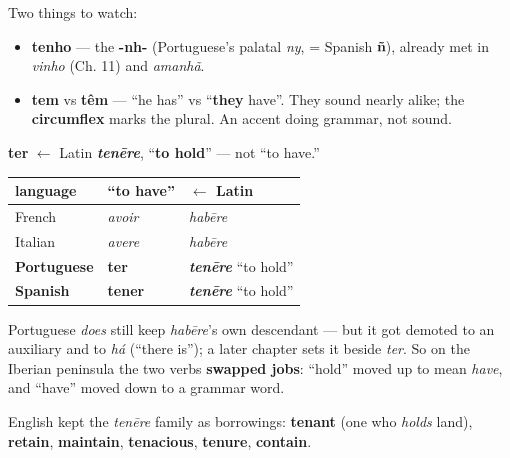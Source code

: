 Two things to watch:

\begin{itemize}
\raggedright
  \item \textbf{tenho} — the \textbf{-nh-} (Portuguese's palatal \emph{ny}, = Spanish \textbf{ñ}), already met in \emph{vinho} (Ch. 11) and \emph{amanhã}.
  \item \textbf{tem} vs \textbf{têm} — \textquotedblleft{}he has\textquotedblright{} vs \textquotedblleft{}\textbf{they} have\textquotedblright{}. They sound nearly alike; the \textbf{circumflex} marks the plural. An accent doing grammar, not sound.
\end{itemize}

\begin{cousinweb}
\textbf{ter} $\leftarrow$ Latin \emph{\textbf{tenēre}}, \textquotedblleft{}\textbf{to hold}\textquotedblright{} — not \textquotedblleft{}to have.\textquotedblright{}

\noindent
\begin{tabularx}{\linewidth}{@{}>{\raggedright\arraybackslash}X>{\raggedright\arraybackslash}X>{\raggedright\arraybackslash}X@{}}
\toprule
\textbf{language} & \textbf{\textquotedblleft{}to have\textquotedblright{}} & \textbf{$\leftarrow$ Latin} \\
\midrule
French & \emph{avoir} & \emph{habēre} \\
Italian & \emph{avere} & \emph{habēre} \\
\textbf{Portuguese} & \textbf{ter} & \emph{\textbf{tenēre}} \textquotedblleft{}to hold\textquotedblright{} \\
\textbf{Spanish} & \textbf{tener} & \emph{\textbf{tenēre}} \textquotedblleft{}to hold\textquotedblright{} \\
\bottomrule
\end{tabularx}

Portuguese \emph{does} still keep \emph{habēre}'s own descendant — but it got demoted to an auxiliary and to \emph{há} (\textquotedblleft{}there is\textquotedblright{}); a later chapter sets it beside \emph{ter}. So on the Iberian peninsula the two verbs \textbf{swapped jobs}: \textquotedblleft{}hold\textquotedblright{} moved up to mean \emph{have}, and \textquotedblleft{}have\textquotedblright{} moved down to a grammar word.

English kept the \emph{tenēre} family as borrowings: \textbf{tenant} (one who \emph{holds} land), \textbf{retain}, \textbf{maintain}, \textbf{tenacious}, \textbf{tenure}, \textbf{contain}.
\end{cousinweb}

